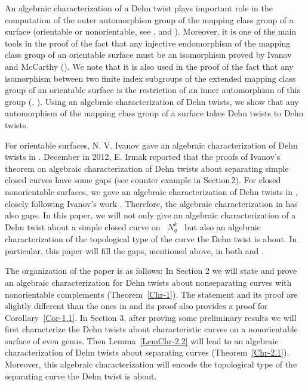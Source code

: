 \documentclass[11 pt]{amsart}
\theoremstyle{definition}
\begin{document}
An algebraic characterization of a Dehn twist plays important role
in the computation of the outer automorphism group of the mapping
class group of a surface (orientable or nonorientable, see \cite{A},
\cite{ASzep} and \cite{I1}). Moreover, it is one of the main tools
in the proof of the fact that any injective endomorphism of the
mapping class group of an orientable surface must be an isomorphism
proved by Ivanov and McCarthy (\cite{I3}). We note that it is also
used in the proof of the fact that any isomorphism between two
finite index subgroups of the extended mapping class group of an
orientable surface is the restriction of an inner automorphism of
this group (\cite{I2}, \cite{K1}). Using an algebraic
characterization of Dehn twists, we show that any automorphism of
the mapping class group of a surface takes Dehn twists to  Dehn
twists.

For orientable surfaces, N. V. Ivanov gave an algebraic
characterization of Dehn twists in \cite{I1}. December in 2012, E.
Irmak reported that the proofs of Ivanov's theorem on algebraic
characterization of Dehn twists about separating simple closed
curves have some gaps (see counter example in Section\,2). For
closed nonorientable surfaces, we gave an algebraic characterization
of Dehn twists in \cite{A}, closely following Ivanov's work
\cite{I1}. Therefore, the algebraic characterization in \cite{A} has
also gaps. In this paper, we will not only give an algebraic
characterization of a Dehn twist about a simple closed curve on \
$N_g^k$ \ but also an algebraic characterization of the topological
type of the curve the Dehn twist is about. In particular, this paper
will fill the gaps, mentioned above, in both \cite{A} and \cite{I1}.

The organization of the paper is as follows: In Section 2 we will
state and prove an algebraic characterization for Dehn twists about
nonseparating curves with nonorientable complements
(Theorem~\ref{Chr-1}). The statement and its proof  are slightly
different than the ones in \cite{A,ASzep} and its proof also
provides a proof for Corollary~\ref{Cor-1.1}. In Section 3, after
proving some preliminary results we will first characterize the Dehn
twists about characteristic curves on a nonorientable surface of
even genus. Then Lemma~\ref{LemChr-2.2} will lead to an  algebraic
characterization of Dehn twists about separating curves
(Theorem~\ref{Chr-2.1}). Moreover, this algebraic characterization
will encode the topological type of the separating curve the Dehn
twist is about.
\end{document}
